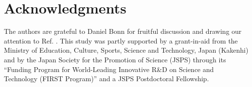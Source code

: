 \documentclass[twocolumn,superscriptaddress]{revtex4}
\begin{document}
\section*{Acknowledgments}
The authors are grateful to Daniel Bonn for fruitful discussion and drawing our attention to Ref. \cite{Aste2004}. 
This study was partly supported by a grant-in-aid from 
the Ministry of Education, Culture, Sports, Science and Technology, Japan (Kakenhi)
and by the Japan Society for the Promotion of
Science (JSPS) through its ``Funding Program for World-Leading
Innovative R\&D on Science and Technology (FIRST Program)'' and a JSPS Postdoctoral Fellowship.






\end{document}
